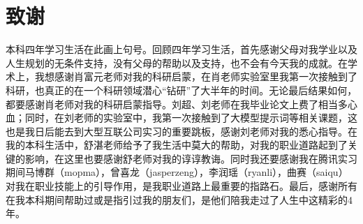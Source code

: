 \documentclass[UTF8,a4paper,12pt]{ctexart}
\numberwithin{equation}{section}
\begin{document}
\newpage
{}

\renewcommand\refname{致谢}

\section*{致\quad 谢}
本科四年学习生活在此画上句号。回顾四年学习生活，首先感谢父母对我学业以及人生规划的无条件支持，没有父母的帮助以及支持，也不会有今天我的成就。在学术上，我想感谢肖富元老师对我的科研启蒙，在肖老师实验室里我第一次接触到了科研，也真正的在一个科研领域潜心“钻研”了大半年的时间。无论最后结果如何，都要感谢肖老师对我的科研启蒙指导。刘超、刘老师在我毕业论文上费了相当多心血；同时，在刘老师的实验室中，我第一次接触到了大模型提示词等相关课题，这也是我日后能去到大型互联公司实习的重要跳板，感谢刘老师对我的悉心指导。在我的本科生活中，舒湛老师给予了我生活中莫大的帮助，对我的职业道路起到了关键的影响，在这里也要感谢舒老师对我的谆谆教诲。同时我还要感谢我在腾讯实习期间马博群（mopma），曾喜龙（jasperzeng），李润瑶（ryanli），曲赛（saiqu）对我在职业技能上的引导作用，是我职业道路上最重要的指路石。最后，感谢所有在我本科期间帮助过或是指引过我的朋友们，是他们陪我走过了人生中这精彩的4年。
\newpage
\thispagestyle{empty}

 
\end{document}
